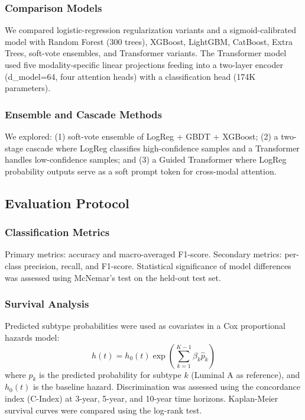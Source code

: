 \documentclass[11pt,a4paper]{article}
\begin{document}
\subsubsection{Comparison Models}
We compared logistic-regression regularization variants and a sigmoid-calibrated model with Random Forest (300 trees), XGBoost, LightGBM, CatBoost, Extra Trees, soft-vote ensembles, and Transformer variants. The Transformer model used five modality-specific linear projections feeding into a two-layer encoder (d\_model=64, four attention heads) with a classification head (174K parameters).

\subsubsection{Ensemble and Cascade Methods}
We explored: (1) soft-vote ensemble of LogReg + GBDT + XGBoost; (2) a two-stage cascade where LogReg classifies high-confidence samples and a Transformer handles low-confidence samples; and (3) a Guided Transformer where LogReg probability outputs serve as a soft prompt token for cross-modal attention.

\subsection{Evaluation Protocol}
\label{sec:eval}

\subsubsection{Classification Metrics}
Primary metrics: accuracy and macro-averaged F1-score. Secondary metrics: per-class precision, recall, and F1-score. Statistical significance of model differences was assessed using McNemar's test on the held-out test set.

\subsubsection{Survival Analysis}
Predicted subtype probabilities were used as covariates in a Cox proportional hazards model:
\begin{equation}
  h(t) = h_0(t) \exp\left(\sum_{k=1}^{K-1} \beta_k \hat{p}_k\right)
  \label{eq:cox}
\end{equation}
where $\hat{p}_k$ is the predicted probability for subtype $k$ (Luminal A as reference), and $h_0(t)$ is the baseline hazard. Discrimination was assessed using the concordance index (C-Index) at 3-year, 5-year, and 10-year time horizons. Kaplan-Meier survival curves were compared using the log-rank test.
\end{document}
